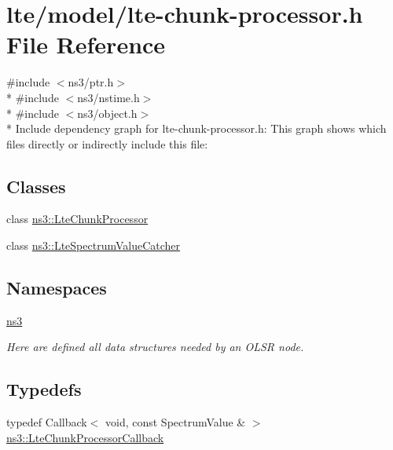 \hypertarget{lte-chunk-processor_8h}{}\section{lte/model/lte-\/chunk-\/processor.h File Reference}
\label{lte-chunk-processor_8h}
{\ttfamily \#include $<$ns3/ptr.\+h$>$}\\*
{\ttfamily \#include $<$ns3/nstime.\+h$>$}\\*
{\ttfamily \#include $<$ns3/object.\+h$>$}\\*
Include dependency graph for lte-\/chunk-\/processor.h\+:
This graph shows which files directly or indirectly include this file\+:
\subsection*{Classes}
\begin{DoxyCompactItemize}
\item 
class \hyperlink{classns3_1_1LteChunkProcessor}{ns3\+::\+Lte\+Chunk\+Processor}
\item 
class \hyperlink{classns3_1_1LteSpectrumValueCatcher}{ns3\+::\+Lte\+Spectrum\+Value\+Catcher}
\end{DoxyCompactItemize}
\subsection*{Namespaces}
\begin{DoxyCompactItemize}
\item 
 \hyperlink{namespacens3}{ns3}
\begin{DoxyCompactList}\small\item\em Here are defined all data structures needed by an O\+L\+SR node. \end{DoxyCompactList}\end{DoxyCompactItemize}
\subsection*{Typedefs}
\begin{DoxyCompactItemize}
\item 
typedef Callback$<$ void, const Spectrum\+Value \& $>$ \hyperlink{namespacens3_a1eefbcc1769adf9e530f2912bc946dd1}{ns3\+::\+Lte\+Chunk\+Processor\+Callback}
\end{DoxyCompactItemize}
